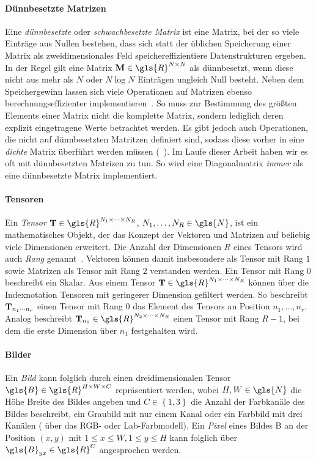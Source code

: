 \paragraph{Dünnbesetzte Matrizen}

Eine \emph{dünnbesetzte} oder \emph{schwachbesetzte Matrix} ist eine Matrix, bei der so viele Einträge aus Nullen bestehen, dass sich statt der üblichen Speicherung einer Matrix als zweidimensionales Feld speichereffizientiere Datenstrukturen ergeben.
In der Regel gilt eine Matrix $\ma{M}\in \gls{R}^{N \times N}$ als dünnbesetzt, wenn diese nicht aus mehr als $N$ oder $N \log N$ Einträgen ungleich Null besteht.
Neben dem Speichergewinn lassen sich viele Operationen auf Matrizen ebenso berechnungseffizienter implementieren~\cite{Saad}.
So muss \zB{} zur Bestimmung des größten Elements einer Matrix nicht die komplette Matrix, sondern lediglich deren explizit eingetragene Werte betrachtet werden.
Es gibt jedoch auch Operationen, die nicht auf dünnbesetzten Matritzen definiert sind, sodass diese vorher in eine \emph{dichte} Matrix überführt werden müssen (\vgl{}~\cite{Saad}).
Im Laufe dieser Arbeit haben wir es oft mit dünnbesetzten Matrizen zu tun.
So wird \zB{} eine Diagonalmatrix \emph{immer} als eine dünnbesetzte Matrix implementiert.

\paragraph{Tensoren}

Ein \emph{Tensor} $\ma{T} \in \gls{R}^{N_1 \times \cdots \times N_R}$, $N_1, \ldots, N_R \in \gls{N}$, ist ein mathematisches Objekt, der das Konzept der Vektoren und Matrizen auf beliebig viele Dimensionen erweitert.
Die Anzahl der Dimensionen $R$ eines Tensors wird auch \emph{Rang} genannt~\cite{linear}.
Vektoren können damit insbesondere als Tensor mit Rang $1$ sowie Matrizen als Tensor mit Rang $2$ verstanden werden.
Ein Tensor mit Rang $0$ beschreibt ein Skalar.
Aus einem Tensor $\ma{T} \in \gls{R}^{N_1 \times \cdots \times N_R}$ können über die Indexnotation Tensoren mit geringerer Dimension gefiltert werden.
So beschreibt $\mathbf{T}_{n_1 \cdots n_r}$ einen Tensor mit Rang $0$ \bzw{} das Element des Tensors an Position $n_1, \ldots, n_r$.
Analog beschreibt \zB{} $\ma{T}_{n_1} \in \gls{R}^{N_2 \times \cdots \times N_R}$ einen Tensor mit Rang $R-1$, bei dem die erste Dimension über $n_1$ festgehalten wird.

\paragraph{Bilder}

Ein \emph{Bild} kann folglich durch einen dreidimensionalen Tensor $\gls{B} \in \gls{R}^{H \times W \times C}$ repräsentiert werden, wobei $H, W \in \gls{N}$ die Höhe \bzw{} Breite des Bildes angeben und $C \in \left\{1, 3\right\}$ die Anzahl der Farbkanäle des Bildes beschreibt, \dhe{} ein Graubild mit nur einem Kanal oder ein Farbbild mit drei Kanälen (\zB{} über das RGB- oder Lab-Farbmodell).
Ein \emph{Pixel} eines Bildes \gls{B} an der Position $\left(x, y\right)$ mit $1 \leq x \leq W, 1 \leq y \leq H$ kann folglich über $\gls{B}_{yx} \in \gls{R}^C$ angesprochen werden.
